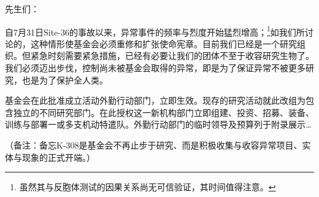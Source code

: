 \hr

\begin{scpbox}


先生们：

自7月31日Site-36的事故以来，异常事件的频率与烈度开始猛烈增高；\footnote{虽然其与反胞体测试的因果关系尚无可信验证，其时间值得注意。}如我们所讨论的，这种情形使基金会必须重修和扩张使命宪章。目前我们已经是一个研究组织。但紧急时刻需要紧急措施，已经有必要让我们的团体不至于收容研究生物了。我们必须迈出步伐，控制尚未被基金会取得的异常，即是为了保证异常不被更多研究，也是为了保护全人类。

基金会在此批准成立活动外勤行动部门，立即生效。现存的研究活动就此改组为包含独立的不同研究部门。在此授权这一新机构部门立即组建、投资、招募、装备、训练与部署一或多支机动特遣队。外勤行动部门的临时领导及预算列于附录展示…

\end{scpbox}

（备注：备忘K-308是基金会不再止步于研究、而是积极收集与收容异常项目、实体与现象的正式开端。）

\hr

